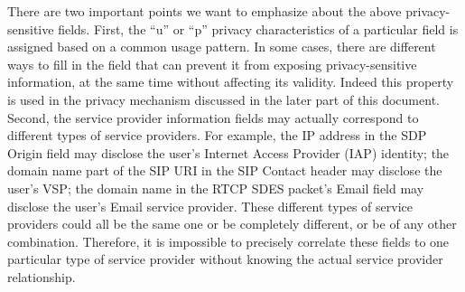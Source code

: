 \documentclass[letterpaper,notitlepage,times,12pt]{article}
\begin{document}
There are two important points we want to emphasize about the above privacy-sensitive fields. First, the ``u'' or ``p'' privacy characteristics of a particular field is assigned based on a common usage pattern. In some cases, there are different ways to fill in the field that can prevent it from exposing privacy-sensitive information, at the same time without affecting its validity. Indeed this property is used in the privacy mechanism discussed in the later part of this document. Second, the service provider information fields may actually correspond to different types of service providers. For example, the IP address in the SDP {\sf Origin} field may disclose the user's Internet Access Provider (IAP) identity; the domain name part of the SIP URI in the SIP {\sf Contact} header may disclose the user's VSP; the domain name in the RTCP SDES packet's {\sf Email} field may disclose the user's Email service provider. These different types of service providers could all be the same one or be completely different, or be of any other combination. Therefore, it is impossible to precisely correlate these fields to one particular type of service provider without knowing the actual service provider relationship.
\end{document}
